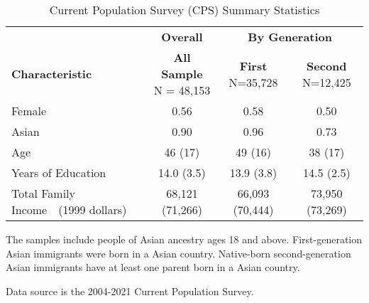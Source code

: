 \begin{table}

\caption{Current Population Survey (CPS) Summary Statistics \label{tab:sumstat-adults}}
\centering
\begin{threeparttable}
\begin{tabular}[t]{lccc}
\toprule
\multicolumn{1}{c}{ } & \multicolumn{1}{c}{\textbf{Overall}} & \multicolumn{2}{c}{\textbf{By Generation}} \\
\cmidrule(l{3pt}r{3pt}){2-2} \cmidrule(l{3pt}r{3pt}){3-4}
\textbf{Characteristic} & \makecell[c]{\textbf{All Sample} \\N = 48,153} & \makecell[c]{\textbf{First} \\N=35,728} & \makecell[c]{\textbf{Second} \\N=12,425}\\
\midrule
Female & 0.56 & 0.58 & 0.50\\
Asian & 0.90 & 0.96 & 0.73\\
Age & 46 (17) & 49 (16) & 38 (17)\\
Years of Education & 14.0 (3.5) & 13.9 (3.8) & 14.5 (2.5)\\
Total Family Income\ \ 	 (1999 dollars) & 68,121 (71,266) & 66,093 (70,444) & 73,950 (73,269)\\
\bottomrule
\end{tabular}
\begin{tablenotes}
\item[1] The samples include people of Asian ancestry ages 18 and above. First-generation Asian immigrants were born in a Asian country. Native-born second-generation Asian immigrants have at least one parent born in a Asian country. 
\item[2] Data source is the 2004-2021 Current Population Survey.
\end{tablenotes}
\end{threeparttable}
\end{table}
